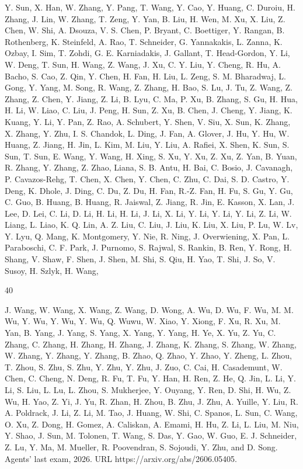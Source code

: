 \documentclass[
  10
]{article}
\begin{document}
Y. Sun, X. Han, W. Zhang, Y. Pang, T. Wang, Y. Cao, Y. Huang, C. Duroiu,
H. Zhang, J. Lin, W. Zhang, T. Zeng, Y. Yan, B. Liu, H. Wen, M. Xu, X.
Liu, Z. Chen, W. Shi, A. Dsouza, V. S. Chen, P. Bryant, C. Boettiger, Y.
Rangan, B. Rothenberg, K. Steinfeld, A. Rao, T. Schneider, G.
Yannakakis, L. Zanna, K. Ozbay, I. Sim, T. Zohdi, G. E. Karniadakis, J.
Gallant, T. Head-Gordon, Y. Li, W. Deng, T. Sun, H. Wang, Z. Wang, J.
Xu, C. Y. Liu, Y. Cheng, R. Hu, A. Bacho, S. Cao, Z. Qin, Y. Chen, H.
Fan, H. Liu, L. Zeng, S. M. Bharadwaj, L. Gong, Y. Yang, M. Song, R.
Wang, Z. Zhang, H. Bao, S. Lu, J. Tu, Z. Wang, Z. Zhang, Z. Chen, Y.
Jiang, Z. Li, B. Lyu, C. Ma, P. Xu, B. Zhang, S. Gu, H. Hua, H. Li, W.
Liao, C. Liu, J. Peng, H. Sun, Z. Xu, B. Chen, J. Cheng, Y. Jiang, K.
Kuang, Y. Li, Y. Pan, Z. Rao, A. Schubert, Y. Shen, V. Siu, X. Sun, K.
Zhang, X. Zhang, Y. Zhu, I. S. Chandok, L. Ding, J. Fan, A. Glover, J.
Hu, Y. Hu, W. Huang, Z. Jiang, H. Jin, L. Kim, M. Liu, Y. Liu, A.
Rafiei, X. Shen, K. Sun, S. Sun, T. Sun, E. Wang, Y. Wang, H. Xing, S.
Xu, Y. Xu, Z. Xu, Z. Yan, B. Yuan, R. Zhang, Y. Zhang, Z. Zhao, Liana,
S. B. Antu, H. Bai, C. Bosio, J. Cavanagh, P. Cavazos-Rehg, T. Chen, X.
Chen, Y. Chen, C. Zhu, C. Dai, S. D. Castro, Y. Deng, K. Dhole, J. Ding,
C. Du, Z. Du, H. Fan, R.-Z. Fan, H. Fu, S. Gu, Y. Gu, C. Guo, B. Huang,
B. Huang, R. Jaiswal, Z. Jiang, R. Jin, E. Kasson, X. Lan, J. Lee, D.
Lei, C. Li, D. Li, H. Li, H. Li, J. Li, X. Li, Y. Li, Y. Li, Y. Li, Z.
Li, W. Liang, L. Liao, K. Q. Lin, A. Z. Liu, C. Liu, J. Liu, K. Liu, X.
Liu, P. Lu, W. Lv, Y. Lyu, Q. Mang, K. Montgomery, Y. Nie, R. Ning, J.
Overwiening, X. Pan, L. Paraboschi, C. F. Park, J. Purnomo, S. Rajwal,
S. Rankin, B. Ren, Y. Rong, H. Shang, V. Shaw, F. Shen, J. Shen, M. Shi,
S. Qiu, H. Yao, T. Shi, J. So, V. Susoy, H. Szlyk, H. Wang,

40

J. Wang, W. Wang, X. Wang, Z. Wang, D. Wong, A. Wu, D. Wu, F. Wu, M. M.
Wu, Y. Wu, Y. Wu, Y. Wu, Q. Wuwu, W. Xiao, Y. Xiong, F. Xu, R. Xu, M.
Yan, B. Yang, J. Yang, S. Yang, X. Yang, Y. Yang, H. Ye, X. Yu, Z. Yu,
C. Zhang, C. Zhang, H. Zhang, H. Zhang, J. Zhang, K. Zhang, S. Zhang, W.
Zhang, W. Zhang, Y. Zhang, Y. Zhang, B. Zhao, Q. Zhao, Y. Zhao, Y.
Zheng, L. Zhou, T. Zhou, S. Zhu, S. Zhu, Y. Zhu, Y. Zhu, J. Zuo, C. Cai,
H. Casademunt, W. Chen, C. Cheng, N. Deng, R. Fu, T. Fu, Y. Han, H. Ren,
Z. He, Q. Jin, L. Li, Y. Li, S. Liu, L. Lu, L. Zhou, S. Mukherjee, Y.
Ouyang, Y. Ren, D. Shi, H. Wu, Z. Wu, H. Yao, Z. Yi, J. Yu, R. Zhan, H.
Zhou, B. Zhu, J. Zhu, A. Yuille, Y. Liu, R. A. Poldrack, J. Li, Z. Li,
M. Tao, J. Huang, W. Shi, C. Spanos, L. Sun, C. Wang, O. Xu, Z. Dong, H.
Gomez, A. Caliskan, A. Emami, H. Hu, Z. Li, L. Liu, M. Niu, Y. Shao, J.
Sun, M. Tolonen, T. Wang, S. Das, Y. Gao, W. Guo, E. J. Schneider, Z.
Lu, Y. Ma, M. Mueller, R. Poovendran, S. Sojoudi, Y. Zhu, and D. Song.
Agents' last exam, 2026. URL https://arxiv.org/abs/2606.05405.
\end{document}
